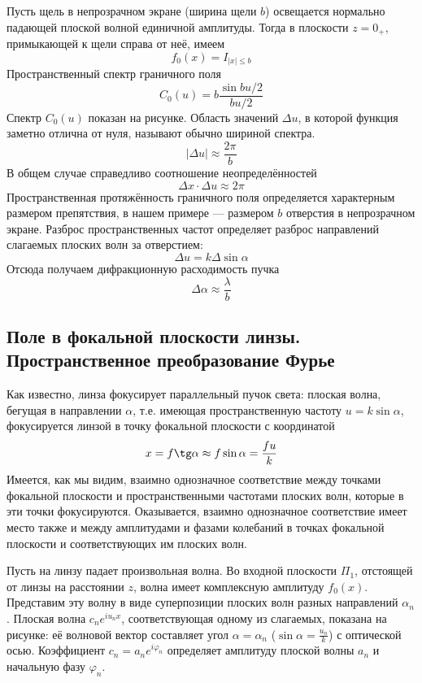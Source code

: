 Пусть щель в непрозрачном экране (ширина щели $b$) освещается нормально падающей плоской волной единичной амплитуды. Тогда в плоскости $z=0_+$, примыкающей к щели справа от неё, имеем
\[
f_0(x) = I_{|x| \le b}
\]
Пространственный спектр граничного поля
\[
C_0(u) = b\frac{\sin bu / 2}{bu / 2}
\]
Спектр $C_0(u)$ показан на рисунке. Область значений $\Delta u$, в которой функция заметно отлична от нуля, называют обычно шириной спектра.
\[
|\Delta u| \approx \frac{2\pi}{b}
\]
В общем случае справедливо соотношение неопределённостей
\[
\Delta x \cdot \Delta u \approx 2\pi
\]
Пространственная протяжённость граничного поля определяется характерным размером препятствия, в нашем примере --- размером $b$ отверстия в непрозрачном экране. Разброс пространственных частот определяет разброс направлений слагаемых плоских волн за отверстием:
\[
\Delta u = k \Delta \sin\alpha
\]
Отсюда получаем дифракционную расходимость пучка
\[
\Delta\alpha \approx \frac{\lambda}{b}
\]

\subsection{Поле в фокальной плоскости линзы. Пространственное преобразование Фурье}
Как известно, линза фокусирует параллельный пучок света: плоская волна, бегущая в направлении $\alpha$, т.е. имеющая пространственную частоту $u = k\sin\alpha$, фокусируется линзой в точку фокальной плоскости с координатой
\[
x = f\tg \alpha \approx f\sin\alpha = \frac{fu}{k}
\]
Имеется, как мы видим, взаимно однозначное соответствие между точками фокальной плоскости и пространственными частотами плоских волн, которые в эти точки фокусируются. Оказывается, взаимно однозначное соответствие имеет место также и между амплитудами и фазами колебаний в точках фокальной плоскости и соответствующих им плоских волн.

\begin{figure}[ht!]
\end{figure}

Пусть на линзу падает произвольная волна. Во входной плоскости $\Pi_1$, отстоящей от линзы на расстоянии $z$,  волна имеет комплексную амплитуду $f_0(x)$. Представим эту волну в виде суперпозиции плоских волн разных направлений $\alpha_n$. Плоская волна $c_n e^{iu_nx}$, соответствующая одному из слагаемых, показана на рисунке: её волновой вектор составляет угол $\alpha = \alpha_n$ ($\sin\alpha = \frac{u_n}{k}$) с оптической осью. Коэффициент $c_n = a_n e^{i\varphi_n}$ определяет амплитуду плоской волны $a_n$ и начальную фазу $\varphi_n$.

